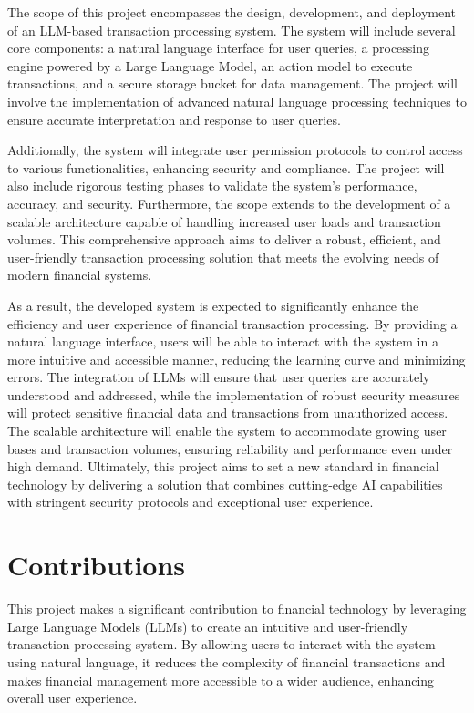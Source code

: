 The scope of this project encompasses the design, development, and deployment of an LLM-based transaction processing system. The system will include several core components: a natural language interface for user queries, a processing engine powered by a Large Language Model, an action model to execute transactions, and a secure storage bucket for data management. The project will involve the implementation of advanced natural language processing techniques to ensure accurate interpretation and response to user queries.

\noindent Additionally, the system will integrate user permission protocols to control access to various functionalities, enhancing security and compliance. The project will also include rigorous testing phases to validate the system's performance, accuracy, and security. Furthermore, the scope extends to the development of a scalable architecture capable of handling increased user loads and transaction volumes. This comprehensive approach aims to deliver a robust, efficient, and user-friendly transaction processing solution that meets the evolving needs of modern financial systems.

\clearpage

\noindent As a result, the developed system is expected to significantly enhance the efficiency and user experience of financial transaction processing. By providing a natural language interface, users will be able to interact with the system in a more intuitive and accessible manner, reducing the learning curve and minimizing errors. The integration of LLMs will ensure that user queries are accurately understood and addressed, while the implementation of robust security measures will protect sensitive financial data and transactions from unauthorized access. The scalable architecture will enable the system to accommodate growing user bases and transaction volumes, ensuring reliability and performance even under high demand. Ultimately, this project aims to set a new standard in financial technology by delivering a solution that combines cutting-edge AI capabilities with stringent security protocols and exceptional user experience.

\section{Contributions}

\noindent This project makes a significant contribution to financial technology by leveraging Large Language Models (LLMs) to create an intuitive and user-friendly transaction processing system. By allowing users to interact with the system using natural language, it reduces the complexity of financial transactions and makes financial management more accessible to a wider audience, enhancing overall user experience.

